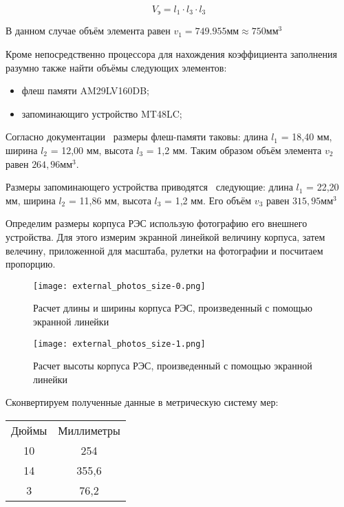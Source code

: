 \begin{equation}
  V \mathrm{_э} = l_1 \cdot l_3 \cdot l_3
\end{equation}

В данном случае объём элемента равен
$v_1 = 749.955 \mathrm{мм} \approx 750 \mathrm{мм}^3$


Кроме непосредственно процессора для нахождения коэффициента
заполнения разумно также найти объёмы следующих элементов:
\begin{itemize}[nosep]
\item флеш памяти AM29LV160DB;
\item запоминающиго устройство MT48LC;
\end{itemize}

Согласно документации~\cite{FlashMemoryDatasheet} размеры
флеш-памяти
таковы:
длина $l_1$ = 18,40 мм, ширина $l_2$ = 12,00 мм, высота $l_3$ = 1,2 мм.
Таким образом объём элемента $v_2$ равен $264,96 \mathrm{мм}^3$.

Размеры запоминающего устройства приводятся~\cite{SDRAM_Datasheet}
следующие: длина $l_1$ = 22,20 мм, ширина $l_2$ = 11,86 мм, высота
$l_3$ = 1,2 мм. Его объём $v_3$ равен $315,95 \mathrm{мм}^3$

Определим размеры корпуса РЭС использую фотографию его внешнего
устройства. Для этого измерим экранной линейкой величину корпуса,
затем велечину, приложенной для масштаба, рулетки на фотографии и
посчитаем пропорцию.


\begin{figure}[h]
  \centering
  \texttt{[image: external\_photos\_size-0.png]}
  \caption{Расчет длины и ширины корпуса РЭС, произведенный с помощью
экранной линейки}
\end{figure}



\begin{figure}[h]
  \centering
  \texttt{[image: external\_photos\_size-1.png]}
  \caption{Расчет высоты корпуса РЭС, произведенный с помощью
экранной линейки}
\end{figure}
\newpage


\begin{table}
Сконвертируем полученные данные в метрическую систему мер:\\
  \centering
\begin{tabular}[b]{c | c}

    \hline
  Дюймы & Миллиметры \\ 
  10    & 254 \\
    14    & 355,6 \\
  3     & 76,2 \\

\end{tabular}
\end{table}

